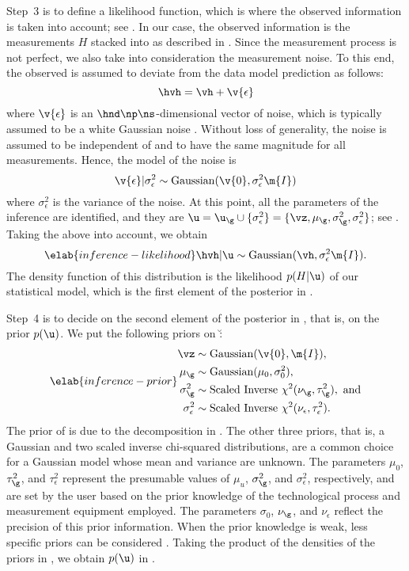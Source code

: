 Step~3 is to define a likelihood function, which is where the observed
information is taken into account; see . In our case,
the observed information is the measurements $H$ stacked into \hvh as described
in . Since the measurement process is not perfect, we
also take into consideration the measurement noise. To this end, the observed
\hvh is assumed to deviate from the data model prediction \vh as follows:
\[
  \hvh = \vh + \v{\epsilon}
\]
where $\v{\epsilon}$ is an $\hnd \np \ns$-dimensional vector of noise, which is
typically assumed to be a white Gaussian noise \cite{rasmussen2006,
marzouk2009}. Without loss of generality, the noise is assumed to be independent
of \g and to have the same magnitude for all measurements. Hence, the model of
the noise is
\[
  \v{\epsilon} | \sigma^2_\epsilon \sim \mathrm{Gaussian}(\v{0}, \sigma^2_\epsilon \m{I})
\]
where $\sigma^2_\epsilon$ is the variance of the noise. At this point, all the
parameters of the inference are identified, and they are $\u = \u_\g \cup \{
\sigma_\epsilon^2 \} = \{ \vz, \mu_\g, \sigma_\g^2, \sigma_\epsilon^2 \}$; see
. Taking the above into account, we obtain
\begin{equation} \elab{inference-likelihood}
  \hvh | \u \sim \mathrm{Gaussian}(\vh, \sigma_\epsilon^2 \m{I}).
\end{equation}
The density function of this distribution is the likelihood $p(H | \u)$ of our
statistical model, which is the first element of the posterior in
.

Step~4 is to decide on the second element of the posterior in
, that is, on the prior $p(\u)$. We put the following priors
on \u:
\begin{align} \elab{inference-prior}
  \begin{split}
    \vz               & \sim \mathrm{Gaussian}(\v{0}, \m{I}), \\
    \mu_\g            & \sim \mathrm{Gaussian}(\mu_0, \sigma^2_0), \\
    \sigma^2_\g       & \sim \mathrm{Scaled\ Inverse\ } \chi^2(\nu_\g, \tau^2_\g), \text{ and} \\
    \sigma^2_\epsilon & \sim \mathrm{Scaled\ Inverse\ } \chi^2(\nu_\epsilon, \tau^2_\epsilon).
  \end{split}
\end{align}
The prior of \vz is due to the decomposition in . The
other three priors, that is, a Gaussian and two scaled inverse chi-squared
distributions, are a common choice for a Gaussian model whose mean and variance
are unknown. The parameters $\mu_0$, $\tau^2_\g$, and $\tau^2_\epsilon$
represent the presumable values of $\mu_u$, $\sigma^2_\g$, and
$\sigma^2_\epsilon$, respectively, and are set by the user based on the prior
knowledge of the technological process and measurement equipment employed. The
parameters $\sigma_0$, $\nu_\g$, and $\nu_\epsilon$ reflect the precision of
this prior information. When the prior knowledge is weak, less specific priors
can be considered \cite{gelman2004}. Taking the product of the densities of the
priors in , we obtain $p(\u)$ in .

